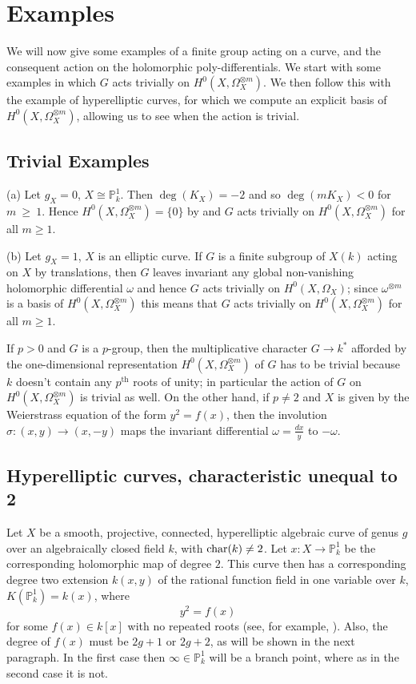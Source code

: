 \section{Examples}
We will now give some examples of a finite group acting on a curve, and the consequent action on the holomorphic poly-differentials. 
We start with some examples in which $G$ acts trivially on $H^0(X,\Omega_X^{\otimes m})$.
We then follow this with the example of hyperelliptic curves, for which we compute an explicit basis of $H^0(X,\Omega_X^{\otimes m})$, allowing us to see when the action is trivial.


\subsection{Trivial Examples}\label{examplessection}


(a) Let $g_X = 0$, \ie $X\cong \mathbb P_k^1$.
Then $\deg(K_X) = -2$ and so $\deg(mK_X) < 0$ for $m~\geq~1$.
Hence $H^0(X,\Omega_X^{\otimes m}) =\{0\}$ by \cite[Lem. 2, pg. 295]{hart} and $G$ acts trivially on $H^0(X,\Omega_X^{\otimes m})$ for all $m\geq 1$.

(b) Let $g_X = 1$, \ie $X$ is an elliptic curve.
If $G$ is a finite subgroup of $X(k)$ acting on $X$ by translations, then $G$ leaves invariant any global non-vanishing holomorphic differential $\omega$ and hence $G$ acts trivially on $H^0(X,\Omega_X)$;
since $\omega^{\otimes m}$ is a basis of $H^0(X,\Omega_X^{\otimes m})$ this means that $G$ acts trivially on $H^0(X,\Omega_X^{\otimes m})$ for all $m\geq 1$.

If $p>0$ and $G$ is a $p$-group, then the multiplicative character $G\rightarrow k^*$ afforded by the one-dimensional representation $H^0(X,\Omega_X^{\otimes m})$ of $G$ has to be trivial because $k$ doesn't contain any $p^{\mbox{th}}$ roots of unity;
in particular the action of $G$ on $H^0(X,\Omega_X^{\otimes m})$ is trivial as well.
On the other hand, if $p\neq 2$ and $X$ is given by the Weierstrass equation of the form $y^2 = f(x)$, then the involution $\sigma : (x,y) \rightarrow (x,-y)$ maps the invariant differential $\omega = \frac{dx}{y}$ to $-\omega$.


\subsection{Hyperelliptic curves, characteristic unequal to 2}\label{charneq2}
Let $X$ be a smooth, projective, connected, hyperelliptic algebraic curve of genus $g$ over an algebraically closed field $k$, with $\operatorname{char} (k) \neq 2$.
Let $x:X\rightarrow \mathbb{P}_k^1$ be the corresponding holomorphic map of degree $2$.
This curve then has a corresponding degree two extension $k(x,y)$ of the rational function field in one variable over $k$, $K(\mathbb P_k^1) = k(x)$, where
   \begin{equation}\label{definingequation}
   y^2 = f(x)
   \end{equation}
for some $f(x)\in k[x]$ with no repeated roots (see, for example, \cite[Rem. 7.4.25]{liu}).
Also, the degree of $f(x)$ must be $2g+1$ or $2g+2$, as will be shown in the next paragraph.
In the first case then $\infty \in \mathbb P_k^1$ will be a branch point, where as in the second case it is not.

